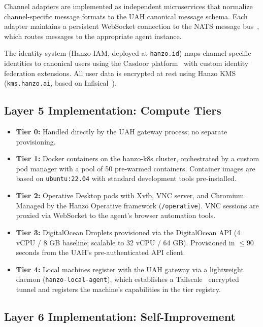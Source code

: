 \documentclass[11pt]{article}
\begin{document}
Channel adapters are implemented as independent microservices that normalize
channel-specific message formats to the UAH canonical message schema. Each
adapter maintains a persistent WebSocket connection to the NATS message
bus~\cite{nats2023}, which routes messages to the appropriate agent
instance.

The identity system (Hanzo IAM, deployed at \texttt{hanzo.id}) maps
channel-specific identities to canonical users using the Casdoor
platform~\cite{casdoor2023} with custom identity federation extensions.
All user data is encrypted at rest using Hanzo KMS (\texttt{kms.hanzo.ai},
based on Infisical~\cite{infisical2023}).

\subsection{Layer 5 Implementation: Compute Tiers}

\begin{itemize}[leftmargin=1.5em]
    \item \textbf{Tier 0:} Handled directly by the UAH gateway process;
          no separate provisioning.
    \item \textbf{Tier 1:} Docker containers on the hanzo-k8s cluster,
          orchestrated by a custom pod manager with a pool of 50 pre-warmed
          containers. Container images are based on \texttt{ubuntu:22.04}
          with standard development tools pre-installed.
    \item \textbf{Tier 2:} Operative Desktop pods with Xvfb, VNC server,
          and Chromium. Managed by the Hanzo Operative framework
          (\texttt{/operative}). VNC sessions are proxied via WebSocket to
          the agent's browser automation tools.
    \item \textbf{Tier 3:} DigitalOcean Droplets provisioned via the
          DigitalOcean API (4 vCPU / 8 GB baseline; scalable to 32 vCPU /
          64 GB). Provisioned in $\leq 90$ seconds from the UAH's
          pre-authenticated API client.
    \item \textbf{Tier 4:} Local machines register with the UAH gateway
          via a lightweight daemon (\texttt{hanzo-local-agent}), which
          establishes a Tailscale~\cite{tailscale2023} encrypted tunnel
          and registers the machine's capabilities in the tier registry.
\end{itemize}

\subsection{Layer 6 Implementation: Self-Improvement}
\end{document}
